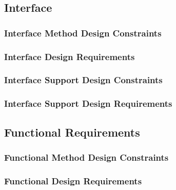 %
%
%
%
\subsection{Interface}

\subsubsection{Interface Method Design Constraints}

\subsubsection{Interface Design Requirements}

\subsubsection{Interface Support Design Constraints}

\subsubsection{Interface Support Design Requirements}

\subsection{Functional Requirements}

\subsubsection{Functional Method Design Constraints}

\subsubsection{Functional Design Requirements}

